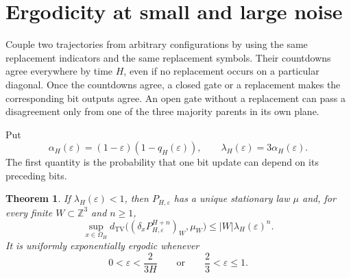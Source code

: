 \documentclass[11pt]{article}
\theoremstyle{plain}
\newtheorem{theorem}{Theorem}[section]
\theoremstyle{definition}
\theoremstyle{remark}
\newcommand{\Z}{\mathbb Z}
\newcommand{\eps}{\varepsilon}
\newcommand{\dtv}{d_{\mathrm{TV}}}
\begin{document}
\section{Ergodicity at small and large noise}\label{sec:ergodicity}

Couple two trajectories from arbitrary configurations by using the same replacement indicators and the same replacement symbols. Their countdowns agree everywhere by time $H$, even if no replacement occurs on a particular diagonal. Once the countdowns agree, a closed gate or a replacement makes the corresponding bit outputs agree. An open gate without a replacement can pass a disagreement only from one of the three majority parents in its own plane.

Put
\begin{equation}\label{eq:alpha}
 \alpha_H(\eps)=(1-\eps)(1-q_H(\eps)),
 \qquad \lambda_H(\eps)=3\alpha_H(\eps).
\end{equation}
The first quantity is the probability that one bit update can depend on its preceding bits.

\begin{theorem}\label{thm:contraction}
If $\lambda_H(\eps)<1$, then $P_{H,\eps}$ has a unique stationary law $\mu$ and, for every finite $W\subset\Z^3$ and $n\geq1$,
\begin{equation}\label{eq:couplingbound}
 \sup_{x\in\Omega_H}\dtv\bigl((\delta_xP_{H,\eps}^{H+n})_W,\mu_W\bigr)
 \leq |W|\lambda_H(\eps)^n.
\end{equation}
It is uniformly exponentially ergodic whenever
\begin{equation}\label{eq:regimes}
 0<\eps<\frac{2}{3H}\qquad\text{or}\qquad\frac23<\eps\leq1.
\end{equation}
\end{theorem}
\end{document}
